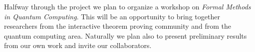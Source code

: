 \documentclass[a4paper]{article}
\begin{document}
Halfway through the project we plan to organize a workshop on
\emph{Formal Methods in Quantum Computing}. This will be an
opportunity to bring together researchers from the interactive theorem
proving community and from the quantum computing area. Naturally we
plan also to present preliminary results from our own work and invite
our collaborators.




\end{document}
